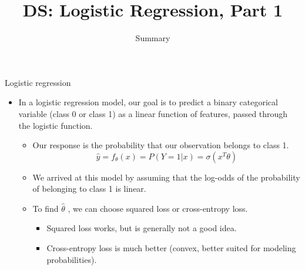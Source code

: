 \documentclass[aspectratio=169]{../latex_main/tntbeamer}  %
\title[Introduction]{DS: Logistic Regression, Part 1}
\subtitle{Summary}
\begin{document}
	
	\maketitle
	\begin{frame}{Logistic regression}
	    \begin{itemize}
	        \item In a logistic regression model, our goal is to predict a binary categorical variable (class 0 or class 1) as a linear function of features, passed through the logistic function.
	        \begin{itemize}
	            \item Our response is the probability that our observation belongs to class 1.
	            \begin{equation*}
	                \hat{y} = f_\theta(x) = P(Y=1|x) = \sigma (x^T\theta)
	            \end{equation*}
	            \item We arrived at this model by assuming that the log-odds of the probability of belonging to class 1 is linear.
	            \item To find  $\hat{\theta}$  , we can choose squared loss or cross-entropy loss.
                \begin{itemize}
                    \item Squared loss works, but is generally not a good idea.
                    \item Cross-entropy loss is much better (convex, better suited for modeling probabilities).
                \end{itemize}
	        \end{itemize}
	    \end{itemize}
	\end{frame}
	
	
	
\end{document}
